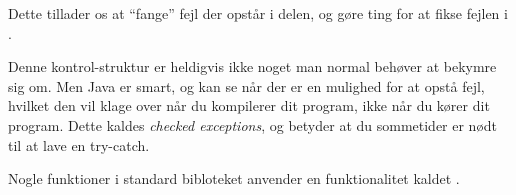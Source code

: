 	Dette tillader os at ``fange'' fejl der opstår i 
	delen, og gøre ting for at fikse fejlen i .

	Denne kontrol-struktur er heldigvis ikke noget man normal behøver at bekymre
	sig om. Men Java er smart, og kan se når der er en mulighed for at opstå
	fejl, hvilket den vil klage over når du kompilerer dit program, ikke når du
	kører dit program. Dette kaldes \emph{checked exceptions}, og betyder at du
	sommetider er nødt til at lave en try-catch.


	Nogle funktioner i standard bibloteket anvender en funktionalitet kaldet
	.
